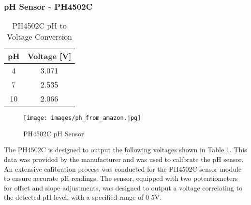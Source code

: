 \documentclass[12pt]{article} %
\begin{document}
\subsubsection{pH Sensor - PH4502C}
\begin{table}[H]
    \centering
    \renewcommand{\arraystretch}{1.25} %
    \begin{tabular}{|c|c|}
        \hline
        \textbf{pH} & \textbf{Voltage [V]} \\
        \hline
        4 & 3.071\\
        \hline
        7 & 2.535\\
        \hline
        10 & 2.066\\
        \hline
    \end{tabular}
    \caption{PH4502C pH to Voltage Conversion}
    \label{tab:PH4502C}
\end{table}
\begin{figure}[H]
    \centering
    \texttt{[image: images/ph\_from\_amazon.jpg]}
    \caption{PH4502C pH Sensor \cite{ref_ph_amazon}}
    \label{fig:PH4502C}
\end{figure}

\noindent The PH4502C \cite{ref_phsensor} is designed to output the following voltages shown in Table \ref{tab:PH4502C}.
This data was provided by the manufacturer and was used to calibrate the pH sensor. An extensive calibration process was conducted for the PH4502C sensor module to ensure accurate pH readings. The sensor, equipped with two potentiometers for offset and slope adjustments, was designed to output a voltage correlating to the detected pH level, with a specified range of 0-5V.
\end{document}
